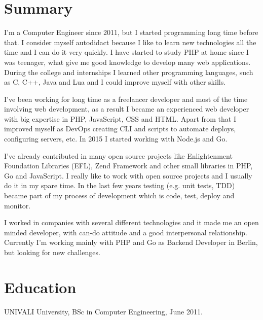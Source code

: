 \documentclass[margin]{res}
\begin{document}
\address{Berlin, DE \\ xguiga@gmail.com \\ Phone: +49 (173) 979-9383 }

\begin{resume}

\section{Summary}
I'm a Computer Engineer since 2011, but I started programming long time before that. I consider myself autodidact because I like to learn new technologies all the time and I can do it very quickly. I have started to study PHP at home since I was teenager, what give me good knowledge to develop many web applications. During the college and internships I learned other programming languages, such as C, C++, Java and Lua and I could improve myself with other skills.

I've been working for long time as a freelancer developer and most of the time involving web development, as a result I became an experienced web developer with big expertise in PHP, JavaScript, CSS and HTML. Apart from that I improved myself as DevOps creating CLI and scripts to automate deploys, configuring servers, etc. In 2015 I started working with Node.js and Go.

I've already contributed in many open source projects like Enlightenment Foundation Libraries (EFL), Zend Framework and other small libraries in PHP, Go and JavaScript. I really like to work with open source projects and I usually do it in my spare time. In the last few years testing (e.g. unit tests, TDD) became part of my process of development which is code, test, deploy and monitor.

I worked in companies with several different technologies and it made me an open minded developer, with can-do attitude and a good interpersonal relationship. Currently I'm working mainly with PHP and Go as Backend Developer in Berlin, but looking for new challenges.

\section{Education} UNIVALI University, BSc in Computer Engineering, June 2011.


\end{resume}
\end{document}
